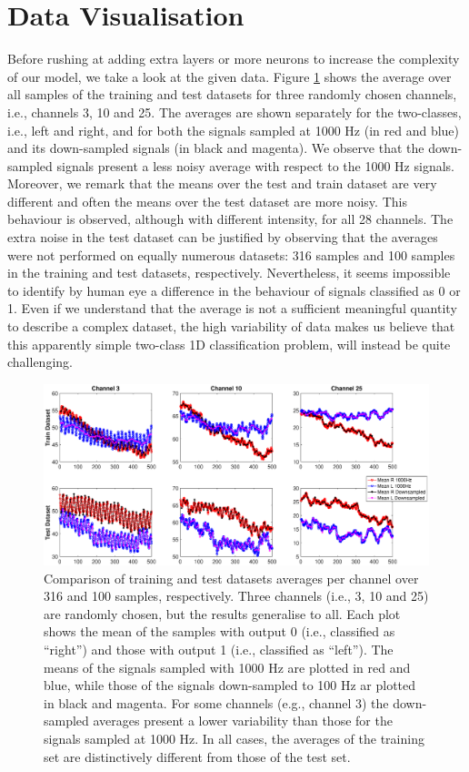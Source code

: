 \documentclass{article}
\begin{document}
 \section{Data Visualisation}\label{sec_visual}
 Before rushing at adding extra layers or more neurons to increase the complexity of our model, we  take a look at the given data. 
 Figure \ref{fig_mean_1000hz_vs_downsampled} shows the average over all samples of the training and test datasets for three randomly chosen channels, i.e., channels 3, 10 and 25. 
The averages are shown separately for the two-classes, i.e., left and right, and for both the signals sampled at 1000 Hz (in red and blue) and its down-sampled signals (in black and magenta). 
We  observe that the down-sampled signals present a less noisy average with respect to the 1000 Hz signals. 
Moreover, we remark that  the means over the test and train dataset are very different and often the means over the test dataset are more noisy. 
This behaviour is observed, although with different intensity, for all 28 channels. 
The extra noise in the test dataset can be justified by observing that the averages were not performed on equally numerous datasets: 316 samples and 100 samples in the training and test datasets, respectively. 
Nevertheless, it seems impossible to identify by human eye a difference in the behaviour of signals classified as 0 or 1. 
Even if we understand that the average is not a sufficient meaningful quantity to describe a complex dataset, the high variability of data makes us believe that this apparently simple two-class 1D classification problem, will instead be quite challenging.  
 \begin{figure}[h]
 \begin{center}
  \includegraphics[width=1\textwidth]{fig/fig4new_mean_downsampled_vs1000} 
  \caption{Comparison of training and test datasets averages per channel over 316 and 100 samples, respectively.  
  Three channels (i.e., 3, 10 and 25) are randomly chosen, but the results generalise to all. 
  Each plot shows the mean of the samples with output 0 (i.e., classified as ``right'') and those with output 1 (i.e., classified as ``left''). 
  The means of the signals sampled with 1000 Hz are plotted in red and blue, while those of the signals down-sampled to 100 Hz ar plotted in black and magenta. 
For some channels (e.g., channel 3) the down-sampled averages present a lower variability than those for the signals sampled at 1000 Hz. 
  In all cases, the averages of the training set are distinctively different from those of the test set. 
  \label{fig_mean_1000hz_vs_downsampled}}
  \end{center}
  \end{figure}
\end{document}
